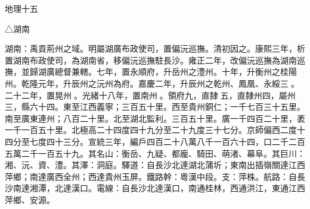 
\begin{pinyinscope}
地理十五

△湖南

湖南：禹貢荊州之域。明屬湖廣布政使司，置偏沅巡撫。清初因之。康熙三年，析置湖南布政使司，為湖南省，移偏沅巡撫駐長沙。雍正二年，改偏沅巡撫為湖南巡撫，並歸湖廣總督兼轄。七年，置永順府，升岳州之澧州。十年，升衡州之桂陽州。乾隆元年，升辰州之沅州為府。嘉慶二年，升辰州之乾州、鳳凰、永綏三。二十二年，置晃州。光緒十八年，置南州。領府九，直隸五，直隸州四，屬州三，縣六十四。東至江西義寧；三百五十里。西至貴州銅仁；一千七百三十五里。南至廣東連州；八百二十里。北至湖北監利。三百五十里。廣一千四百二十里，袤一千一百五十里。北極高二十四度四十九分至二十九度三十七分。京師偏西二度十四分至七度四十三分。宣統三年，編戶四百二十八萬八千一百六十四，口二千二百五萬二千一百五十九。其名山：衡岳、九疑、都龐、騎田、萌渚、幕阜。其巨川：湘、沅、資、澧。其澤：洞庭。驛道：自長沙北達湖北蒲圻；東南出插嶺關達江西萍鄉；南達廣西全州；西達貴州玉屏。鐵路幹：粵漢中段。支：萍株。航路：自長沙南達湘潭，北達漢口。電線：自長沙北達漢口，南通桂林，西通洪江，東通江西萍鄉、安源。


\end{pinyinscope}
